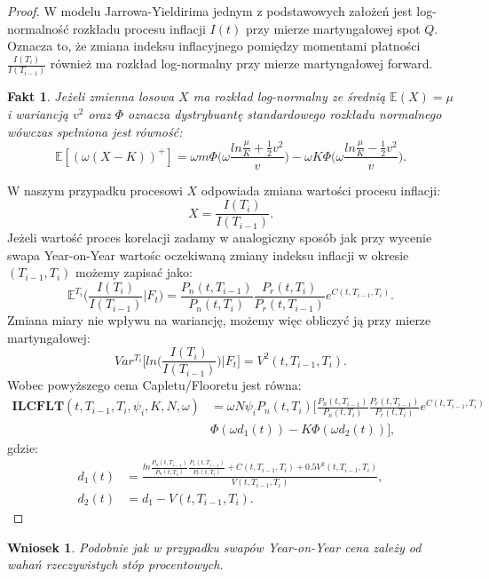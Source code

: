 \documentclass{mini}
\theoremstyle{mythstyle}
\newtheorem{Fakt}{Fakt}[chapter]
\newtheorem{Wniosek}{Wniosek}[chapter]
\begin{document}
\begin{proof}
	W modelu Jarrowa-Yieldirima jednym z podstawowych założeń jest log-normalność rozkładu procesu inflacji $I(t)$ przy mierze martyngałowej spot $Q$. Oznacza to, że zmiana indeksu inflacyjnego pomiędzy momentami płatności $\frac{I(T_i)}{I(T_{i-1})}$ również ma rozkład log-normalny przy mierze martyngałowej forward.\\
	\begin{Fakt}
		Jeżeli zmienna losowa $X$ ma rozkład log-normalny ze średnią $\mathbb{E}(X) = \mu$ i wariancją $v^2$ oraz $\Phi$ oznacza dystrybuantę standardowego rozkładu normalnego wówczas spełniona jest równość:
		\begin{equation}
		\mathbb{E}[(\omega(X - K))^+] = \omega m \Phi\bigg( \omega \frac{ln\frac{\mu}{K} + \frac{1}{2}v^2}{v}\bigg) - \omega K\Phi\bigg( \omega \frac{ln\frac{\mu}{K} - \frac{1}{2}v^2}{v}\bigg).
		\end{equation} 
	\end{Fakt}
	W naszym przypadku procesowi $X$ odpowiada zmiana wartości procesu inflacji: $$X = \frac{I(T_i)}{I(T_{i-1})}.$$ Jeżeli wartość proces korelacji zadamy w analogiczny sposób jak przy wycenie swapa Year-on-Year wartośc oczekiwaną zmiany indeksu inflacji w okresie $(T_{i-1},T_i)$ możemy zapisać jako:
	\begin{equation}
	\mathbb{E}^{T_i} \bigg(	\frac{I(T_i)}{I(T_{i-1})} \bigg|F_t\bigg) = \frac{P_n(t,T_{i-1})}{P_n(t,T_i)} \frac{P_r(t,T_i)}{P_r(t,T_{i-1})} e^{C(t,T_{i-1},T_i)}. 
	\end{equation}
	Zmiana miary nie wpływu na wariancję, możemy więc obliczyć ją przy mierze martyngałowej:
	\begin{equation}
	Var^{T_i} \bigg[ ln\bigg(\frac{I(T_i)}{I(T_{i-1})}\bigg)\bigg|F_t\bigg] = V^2(t,T_{i-1},T_i).
	\end{equation}	
	Wobec powyższego cena Capletu/Flooretu jest równa:
	\begin{align*}
	\mathbf{ILCFLT}(t,T_{i-1},T_i,\psi_i,K,N,\omega) &= \omega N\psi_iP_n(t,T_i)\bigg[ \frac{P_n(t,T_{i-1})}{P_n(t,T_i)} \frac{P_r(t,T_{i-1})}{P_r(t,T_i)} e^{C(t,T_{i-1},T_i)} \\ &\Phi(\omega d_1(t)) - K\Phi(\omega d_2(t))\bigg],
	\end{align*}
	gdzie:
	\begin{align*}
	d_1(t) &= \frac{ln \frac{P_n(t,T_{i-1})}{P_n(t,T_i)} \frac{P_r(t,T_{i-1})}{P_r(t,T_i)} + C(t,T_{i-1},T_i) + 0.5 V^2(t,T_{i-1},T_i)}{V(t,T_{i-1},T_i)},\\
	d_2(t)&= d_1 - V(t,T_{i-1},T_i).
	\end{align*}
\end{proof}
	\begin{Wniosek}
		Podobnie jak w przypadku swapów Year-on-Year cena zależy od wahań rzeczywistych stóp procentowych.
	\end{Wniosek}
\pagebreak
\end{document}
